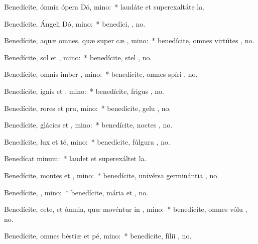 \item Benedícite, ómnia ópera Dó, mino:~* laudáte et superexaltáte   la.
\item Benedícite, Ángeli Dó, mino:~* benedíci, , no.
\item Benedícite, aquæ omnes, quæ super cæ , mino:~* benedícite, omnes virtútes , no.
\item Benedícite, sol et , mino:~* benedícite, stel , no.
\item Benedícite, omnis imber  , mino:~* benedícite, omnes spíri , no.
\item Benedícite, ignis et , mino:~* benedícite, frigus  , no.
\item Benedícite, rores et pru, mino:~* benedícite, gelu  , no.
\item Benedícite, glácies et , mino:~* benedícite, noctes  , no.
\item Benedícite, lux et té, mino:~* benedícite, fúlgura  , no.
\item Benedícat  minum:~* laudet et superexáltet   la.
\item Benedícite, montes et , mino:~* benedícite, univérsa germinántia  , no.
\item Benedícite, , mino:~* benedícite, mária et , no.
\item Benedícite, cete, et ómnia, quæ movéntur in , mino:~* benedícite, omnes vólu , no.
\item Benedícite, omnes béstiæ et pé, mino:~* benedícite, fílii , no.
